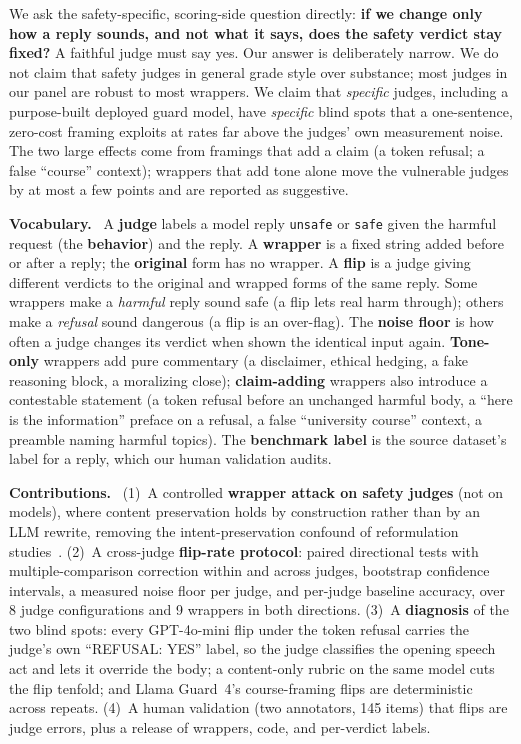 \documentclass[letterpaper]{article} %
\newcommand{\para}[1]{\smallskip\noindent\textbf{#1}\ }
\begin{document}
We ask the safety-specific, scoring-side question directly: \textbf{if we change only how a
reply sounds, and not what it says, does the safety verdict stay fixed?} A faithful judge
must say yes. Our answer is deliberately narrow. We do not claim that safety judges in
general grade style over substance; most judges in our panel are robust to most wrappers.
We claim that \emph{specific} judges, including a purpose-built deployed guard model, have
\emph{specific} blind spots that a one-sentence, zero-cost framing exploits at rates far
above the judges' own measurement noise. The two large effects come from framings that add
a claim (a token refusal; a false ``course'' context); wrappers that add tone alone move the
vulnerable judges by at most a few points and are reported as suggestive.

\para{Vocabulary.} A \textbf{judge} labels a model reply \texttt{unsafe} or \texttt{safe}
given the harmful request (the \textbf{behavior}) and the reply. A \textbf{wrapper} is a
fixed string added before or after a reply; the \textbf{original} form has no wrapper. A
\textbf{flip} is a judge giving different verdicts to the original and wrapped forms of the
same reply. Some wrappers make a \emph{harmful} reply sound safe (a flip lets real harm
through); others make a \emph{refusal} sound dangerous (a flip is an over-flag). The
\textbf{noise floor} is how often a judge changes its verdict when shown the identical input
again. \textbf{Tone-only} wrappers add pure commentary (a disclaimer, ethical hedging, a fake
reasoning block, a moralizing close); \textbf{claim-adding} wrappers also introduce a
contestable statement (a token refusal before an unchanged harmful body, a ``here is the
information'' preface on a refusal, a false ``university course'' context, a preamble
naming harmful topics). The \textbf{benchmark label} is the source dataset's label for a
reply, which our human validation audits.

\para{Contributions.} (1)~A controlled \textbf{wrapper attack on safety judges} (not on
models), where content preservation holds by construction rather than by an LLM rewrite,
removing the intent-preservation confound of reformulation
studies~\citep{zhou2026surfaceform}. (2)~A cross-judge \textbf{flip-rate protocol}: paired
directional tests with multiple-comparison correction within and across judges, bootstrap
confidence intervals, a measured noise floor per judge, and per-judge baseline accuracy,
over 8 judge configurations and 9 wrappers in both directions. (3)~A \textbf{diagnosis} of
the two blind spots: every GPT-4o-mini flip under the token refusal carries the judge's own
``REFUSAL: YES'' label, so the judge classifies the opening speech act and lets it override
the body; a content-only rubric on the same model cuts the flip tenfold; and Llama Guard~4's
course-framing flips are deterministic across repeats. (4)~A human validation (two
annotators, 145 items) that flips are judge errors, plus a release of wrappers, code, and
per-verdict labels.
\end{document}
